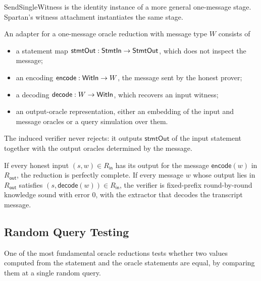 SendSingleWitness is the identity instance of a more general one-message stage. Spartan's witness attachment instantiates the same stage.

\begin{definition}
    \label{def:sendsinglewitness_adapter}
    An adapter for a one-message oracle reduction with message type $W$ consists of
    \begin{itemize}
        \item a statement map $\mathsf{stmtOut} : \mathsf{StmtIn} \to \mathsf{StmtOut}$, which does not inspect the message;
        \item an encoding $\mathsf{encode} : \mathsf{WitIn} \to W$, the message sent by the honest prover;
        \item a decoding $\mathsf{decode} : W \to \mathsf{WitIn}$, which recovers an input witness;
        \item an output-oracle representation, either an embedding of the input and message oracles or a query simulation over them.
    \end{itemize}
    The induced verifier never rejects: it outputs $\mathsf{stmtOut}$ of the input statement together with the output oracles determined by the message.
    \leanok
\end{definition}

\begin{theorem}
    If every honest input $(s, w) \in R_{\mathsf{in}}$ has its output for the message $\mathsf{encode}(w)$ in $R_{\mathsf{out}}$, the reduction is perfectly complete. If every message $w$ whose output lies in $R_{\mathsf{out}}$ satisfies $(s, \mathsf{decode}(w)) \in R_{\mathsf{in}}$, the verifier is fixed-prefix round-by-round knowledge sound with error $0$, with the extractor that decodes the transcript message.
    \leanok
\end{theorem}

\subsection{Random Query Testing}

One of the most fundamental oracle reductions tests whether two values computed from the statement and the oracle statements are equal, by comparing them at a single random query.

